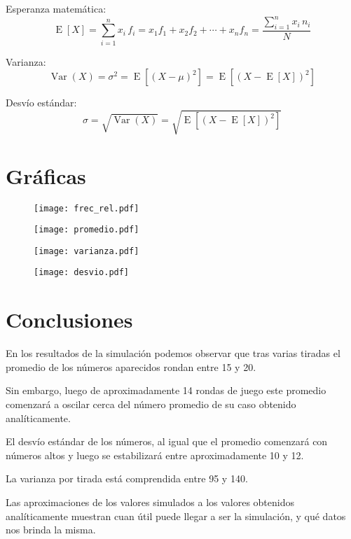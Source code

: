 Esperanza matemática:
\begin{equation}
\operatorname{E}[X] = \sum_{i=1}^{n}x_{i}\,f_{i}=x_{1}f_{1}+x_{2}f_{2}+\cdots +x_{n}f_{n} = \frac{\sum_{i=1}^{n}x_{i}\,n_{i}}{N}
\end{equation}

Varianza:
\begin{equation}
\operatorname{Var}(X) = \sigma^{2} = \operatorname{E}\left[(X - \mu)^{2}\right] = \operatorname{E}\left[(X - \operatorname{E}[X])^{2}\right]
\end{equation}

Desvío estándar:
\begin{equation}
\sigma = \sqrt{\operatorname{Var}(X)} = \sqrt{\operatorname{E}\left[(X - \operatorname{E}[X])^{2}\right]}
\end{equation}

\pagebreak  %
\section{Gráficas}
\begin{figure}[H]
  \centering
  \texttt{[image: frec\_rel.pdf]}
  \label{fig:frec_rel}
\end{figure}

\begin{figure}[H]
  \centering
  \texttt{[image: promedio.pdf]}
  \label{fig:promedio}
\end{figure}

\begin{figure}[H]
  \centering
  \texttt{[image: varianza.pdf]}
  \label{fig:varianza}
\end{figure}

\begin{figure}[H]
  \centering
  \texttt{[image: desvio.pdf]}
  \label{fig:desvio}
\end{figure}

\section{Conclusiones}
En los resultados de la simulación podemos observar que tras varias tiradas el promedio de los números aparecidos rondan entre 15 y 20.

Sin embargo, luego de aproximadamente 14 rondas de juego este promedio comenzará a oscilar cerca del número promedio de su caso obtenido analíticamente.

El desvío estándar de los números, al igual que el promedio comenzará con números altos y luego se estabilizará entre aproximadamente 10 y 12.

La varianza por tirada está comprendida entre 95 y 140.

Las aproximaciones de los valores simulados a los valores obtenidos analíticamente muestran cuan útil puede llegar a ser la simulación, y qué datos nos brinda la misma.

  

